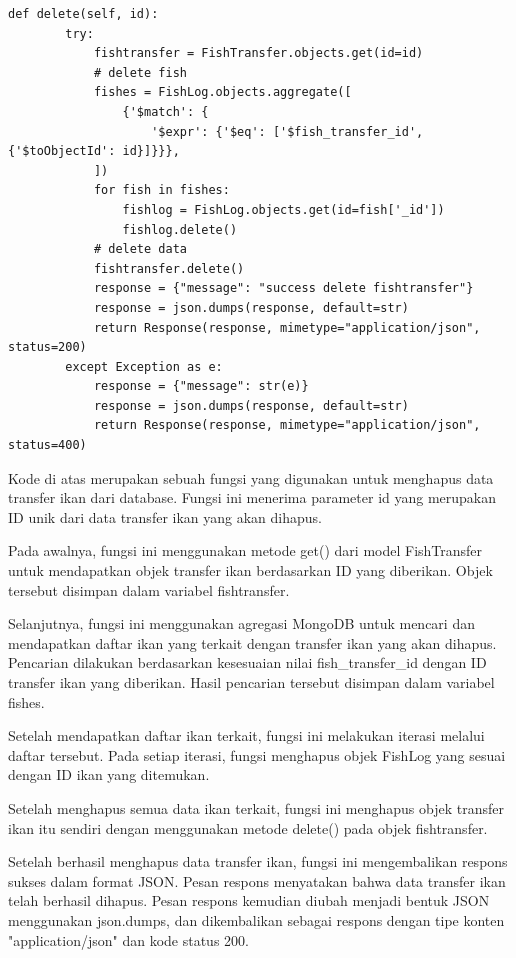 \begin{enumerate}[1.]
\begin{lstlisting}
def delete(self, id):
        try:
            fishtransfer = FishTransfer.objects.get(id=id)
            # delete fish
            fishes = FishLog.objects.aggregate([
                {'$match': {
                    '$expr': {'$eq': ['$fish_transfer_id', {'$toObjectId': id}]}}},
            ])
            for fish in fishes:
                fishlog = FishLog.objects.get(id=fish['_id'])
                fishlog.delete()
            # delete data
            fishtransfer.delete()
            response = {"message": "success delete fishtransfer"}
            response = json.dumps(response, default=str)
            return Response(response, mimetype="application/json", status=200)
        except Exception as e:
            response = {"message": str(e)}
            response = json.dumps(response, default=str)
            return Response(response, mimetype="application/json", status=400)
\end{lstlisting}

Kode di atas merupakan sebuah fungsi yang digunakan untuk menghapus data transfer ikan dari database. Fungsi ini menerima parameter id yang merupakan ID unik dari data transfer ikan yang akan dihapus.

Pada awalnya, fungsi ini menggunakan metode get() dari model FishTransfer untuk mendapatkan objek transfer ikan berdasarkan ID yang diberikan. Objek tersebut disimpan dalam variabel fishtransfer.

Selanjutnya, fungsi ini menggunakan agregasi MongoDB untuk mencari dan mendapatkan daftar ikan yang terkait dengan transfer ikan yang akan dihapus. Pencarian dilakukan berdasarkan kesesuaian nilai fish\_transfer\_id dengan ID transfer ikan yang diberikan. Hasil pencarian tersebut disimpan dalam variabel fishes.

Setelah mendapatkan daftar ikan terkait, fungsi ini melakukan iterasi melalui daftar tersebut. Pada setiap iterasi, fungsi menghapus objek FishLog yang sesuai dengan ID ikan yang ditemukan.

Setelah menghapus semua data ikan terkait, fungsi ini menghapus objek transfer ikan itu sendiri dengan menggunakan metode delete() pada objek fishtransfer.

Setelah berhasil menghapus data transfer ikan, fungsi ini mengembalikan respons sukses dalam format JSON. Pesan respons menyatakan bahwa data transfer ikan telah berhasil dihapus. Pesan respons kemudian diubah menjadi bentuk JSON menggunakan json.dumps, dan dikembalikan sebagai respons dengan tipe konten "application/json" dan kode status 200.


\end{enumerate}
